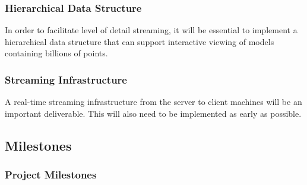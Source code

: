 \documentclass[12pt,a4paper]{article}
\begin{document}
\subsubsection*{Hierarchical Data Structure}
In order to facilitate level of detail streaming, it will be essential to
implement a hierarchical data structure that can support interactive
viewing of models containing billions of points.
\subsubsection*{Streaming Infrastructure}
A real-time streaming infrastructure from the server to client machines will be
an important deliverable. This will also need to be implemented as early as
possible.

\subsection{Milestones}
\subsubsection{Project Milestones}
\end{document}
